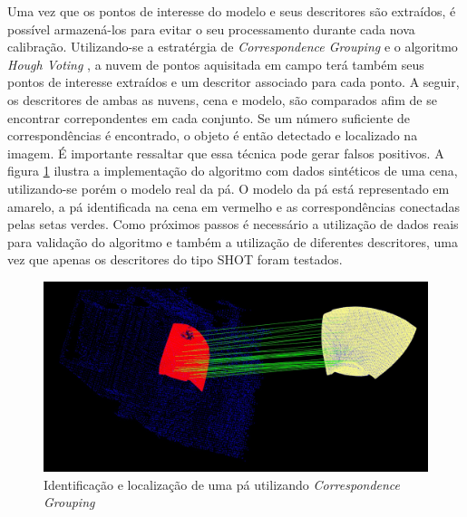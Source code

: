 Uma vez que os pontos de interesse do modelo e seus descritores são extraídos, é
possível armazená-los para evitar o seu processamento  durante cada nova
calibração. Utilizando-se a estratérgia de
\textit{Correspondence Grouping} e o algoritmo \textit{Hough Voting}
\cite{Tombari2010a}, a nuvem de pontos aquisitada em campo terá também seus
pontos de interesse extraídos e um descritor associado para cada ponto. A
seguir, os descritores de ambas as nuvens, cena e modelo, são comparados afim de
se encontrar correpondentes em cada conjunto. Se um número suficiente de
correspondências é encontrado, o objeto é então detectado e localizado na
imagem. É importante ressaltar que essa técnica pode gerar falsos positivos. A
figura \ref{fig::correspondence} ilustra a implementação do algoritmo com 
dados sintéticos de uma cena, utilizando-se porém o modelo real da pá. O modelo
da pá está representado em amarelo, a pá identificada na cena em vermelho e as correspondências
conectadas pelas setas verdes.
Como próximos passos é necessário a utilização de dados reais para validação do
algoritmo e também a utilização de diferentes descritores, uma vez que apenas os
descritores do tipo SHOT foram testados.

\begin{figure}[h!]
   \centering
   \includegraphics[width=0.99\columnwidth]{detail/figs/localizacao/correspondence}
   \caption{Identificação e localização de uma pá utilizando
   \textit{Correspondence Grouping}}
   \label{fig::correspondence}
\end{figure}



